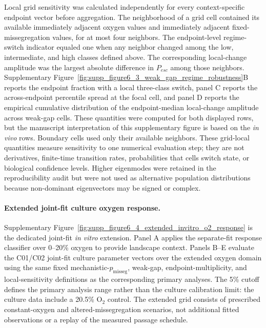 \documentclass[11pt]{article}
\begin{document}
Local grid sensitivity was calculated independently for every context-specific endpoint vector before aggregation. The neighborhood of a grid cell contained its available immediately adjacent oxygen values and immediately adjacent fixed-missegregation values, for at most four neighbors. The endpoint-level regime-switch indicator equaled one when any neighbor changed among the low, intermediate, and high classes defined above. The corresponding local-change amplitude was the largest absolute difference in $P_{esc}$ among those neighbors. Supplementary Figure~\ref{fig:supp_figure6_3_weak_gap_regime_robustness}B reports the endpoint fraction with a local three-class switch, panel C reports the across-endpoint percentile spread at the focal cell, and panel D reports the empirical cumulative distribution of the endpoint-median local-change amplitude across weak-gap cells. These quantities were computed for both displayed rows, but the manuscript interpretation of this supplementary figure is based on the \textit{in vivo} rows. Boundary cells used only their available neighbors. These grid-local quantities measure sensitivity to one numerical evaluation step; they are not derivatives, finite-time transition rates, probabilities that cells switch state, or biological confidence levels. Higher eigenmodes were retained in the reproducibility audit but were not used as alternative population distributions because non-dominant eigenvectors may be signed or complex.

\paragraph{Extended joint-fit culture oxygen response.}
Supplementary Figure~\ref{fig:supp_figure6_4_extended_invitro_o2_response} is the dedicated joint-fit \textit{in vitro} extension. Panel A applies the separate-fit response classifier over 0--20\% oxygen to provide landscape context. Panels B--E evaluate the C01/C02 joint-fit culture parameter vectors over the extended oxygen domain using the same fixed mechanistic-$p_{\mathrm{misseg}}$, weak-gap, endpoint-multiplicity, and local-sensitivity definitions as the corresponding primary analyses. The 5\% cutoff defines the primary analysis range rather than the culture calibration limit: the culture data include a 20.5\% O$_2$ control. The extended grid consists of prescribed constant-oxygen and altered-missegregation scenarios, not additional fitted observations or a replay of the measured passage schedule.
\end{document}
